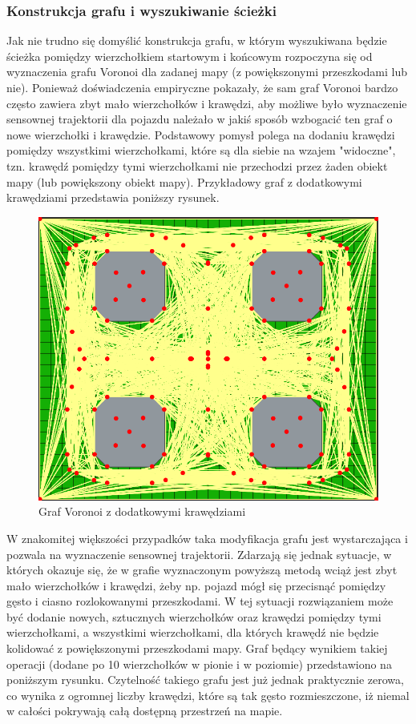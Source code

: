 \documentclass[a4paper,11pt,twoside]{report}
\theoremstyle{definition}
\begin{document}
\subsubsection{Konstrukcja grafu i wyszukiwanie ścieżki}

Jak nie trudno się domyślić konstrukcja grafu, w którym wyszukiwana będzie ścieżka pomiędzy wierzchołkiem startowym i końcowym rozpoczyna się od wyznaczenia grafu Voronoi dla zadanej mapy (z powiększonymi przeszkodami lub nie). Ponieważ doświadczenia empiryczne pokazały, że sam graf Voronoi bardzo często zawiera zbyt mało wierzchołków i krawędzi, aby możliwe było wyznaczenie sensownej trajektorii dla pojazdu należało w jakiś sposób wzbogacić ten graf o nowe wierzchołki i krawędzie. Podstawowy pomysł polega na dodaniu krawędzi pomiędzy wszystkimi wierzchołkami, które są dla siebie na wzajem "widoczne", tzn. krawędź pomiędzy tymi wierzchołkami nie przechodzi przez żaden obiekt mapy (lub powiększony obiekt mapy). Przykładowy graf z dodatkowymi krawędziami przedstawia poniższy rysunek. 

\begin{figure}[h!]
\centering
\includegraphics[scale=0.4]{fullVoronoiGraphForExpandedMap}
\caption[Graf Voronoi z dodatkowymi krawędziami]{Graf Voronoi z dodatkowymi krawędziami}
\end{figure}

W znakomitej większości przypadków taka modyfikacja grafu jest wystarczająca i pozwala na wyznaczenie sensownej trajektorii. Zdarzają się jednak sytuacje, w których okazuje się, że w grafie wyznaczonym powyższą metodą wciąż jest zbyt mało wierzchołków i krawędzi, żeby np. pojazd mógł się przecisnąć pomiędzy gęsto i ciasno rozlokowanymi przeszkodami. W tej sytuacji rozwiązaniem może być dodanie nowych, sztucznych wierzchołków oraz krawędzi pomiędzy tymi wierzchołkami, a wszystkimi wierzchołkami, dla których krawędź nie będzie kolidować z powiększonymi przeszkodami mapy. Graf będący wynikiem takiej operacji (dodane po 10 wierzchołków w pionie i w poziomie) przedstawiono na poniższym rysunku. Czytelność takiego grafu jest już jednak praktycznie zerowa, co wynika z ogromnej liczby krawędzi, które są tak gęsto rozmieszczone, iż niemal w całości pokrywają całą dostępną przestrzeń na mapie.
\end{document}
